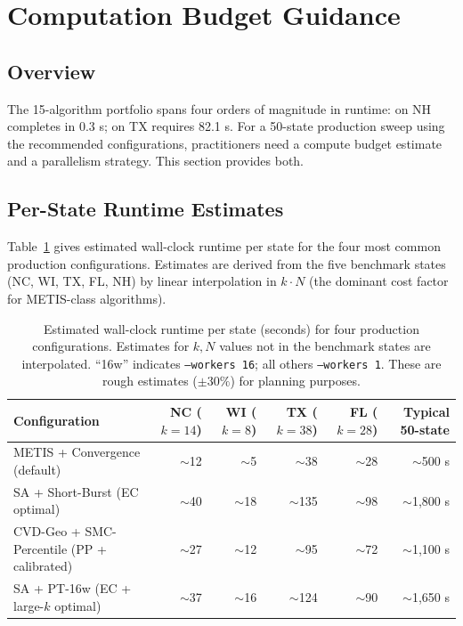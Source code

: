 \section{Computation Budget Guidance}
\label{sec:budget}

\subsection{Overview}

The 15-algorithm portfolio spans four orders of magnitude in runtime:
\flip{} on NH completes in 0.3 s; \sa{} on TX requires 82.1 s.
For a 50-state production sweep using the recommended configurations,
practitioners need a compute budget estimate and a parallelism strategy.
This section provides both.

\subsection{Per-State Runtime Estimates}

Table~\ref{tab:budget-per-state} gives estimated wall-clock runtime per state
for the four most common production configurations.
Estimates are derived from the five benchmark states (NC, WI, TX, FL, NH)
by linear interpolation in $k \cdot N$ (the dominant cost factor for
METIS-class algorithms).

\begin{table}[ht]
\centering
\caption{%
  Estimated wall-clock runtime per state (seconds) for four production
  configurations.
  Estimates for $k, N$ values not in the benchmark states are interpolated.
  ``16w'' indicates \texttt{--workers 16}; all others \texttt{--workers 1}.
  These are rough estimates ($\pm 30\%$) for planning purposes.
}
\label{tab:budget-per-state}
\small
\begin{tabular}{@{}lrrrrr@{}}
\toprule
Configuration & NC ($k=14$) & WI ($k=8$) & TX ($k=38$) & FL ($k=28$) & Typical 50-state \\
\midrule
METIS + Convergence (default)
  &  $\sim$12 & $\sim$5 & $\sim$38 & $\sim$28 & $\sim$500 s \\
SA + Short-Burst (EC optimal)
  &  $\sim$40 & $\sim$18 & $\sim$135 & $\sim$98 & $\sim$1{,}800 s \\
CVD-Geo + SMC-Percentile (PP + calibrated)
  &  $\sim$27 & $\sim$12 & $\sim$95 & $\sim$72 & $\sim$1{,}100 s \\
SA + PT-16w (EC + large-$k$ optimal)
  &  $\sim$37 & $\sim$16 & $\sim$124 & $\sim$90 & $\sim$1{,}650 s \\
\bottomrule
\end{tabular}
\end{table}

